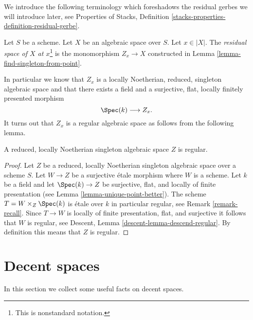 \noindent
We introduce the following terminology which foreshadows
the residual gerbes we will introduce later, see
Properties of Stacks, Definition
\ref{stacks-properties-definition-residual-gerbe}.

\begin{definition}
\label{definition-residual-space}
Let $S$ be a scheme.
Let $X$ be an algebraic space over $S$. Let $x \in |X|$.
The
{\it residual space of $X$ at $x$}\footnote{This is nonstandard notation.}
is the monomorphism $Z_x \to X$ constructed in
Lemma \ref{lemma-find-singleton-from-point}.
\end{definition}

\noindent
In particular we know that $Z_x$ is a
locally Noetherian, reduced, singleton algebraic space
and that there exists a field and a surjective, flat, locally
finitely presented morphism
$$
\Spec(k) \longrightarrow Z_x.
$$
It turns out that $Z_x$
is a regular algebraic space as follows from the following lemma.

\begin{lemma}
\label{lemma-residual-space-regular}
A reduced, locally Noetherian singleton algebraic space $Z$ is regular.
\end{lemma}

\begin{proof}
Let $Z$ be a reduced, locally Noetherian singleton algebraic space
over a scheme $S$. Let $W \to Z$ be a surjective \'etale morphism where $W$
is a scheme. Let $k$ be a field and let $\Spec(k) \to Z$
be surjective, flat, and locally of finite presentation (see
Lemma \ref{lemma-unique-point-better}).
The scheme $T = W \times_Z \Spec(k)$ is
\'etale over $k$ in particular regular, see
Remark \ref{remark-recall}.
Since $T \to W$ is locally of finite presentation, flat, and surjective it
follows that $W$ is regular, see
Descent, Lemma \ref{descent-lemma-descend-regular}.
By definition this means that $Z$ is regular.
\end{proof}











\section{Decent spaces}
\label{section-decent}

\noindent
In this section we collect some useful facts on decent spaces.


